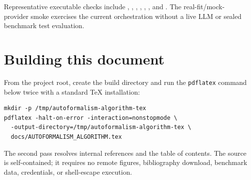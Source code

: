 \documentclass[11pt]{article}
\begin{document}
\begin{flushleft}
Representative executable checks include
,
,
,
,
,
, and
. The real-fit/mock-provider smoke
 exercises the current orchestration
without a live LLM or sealed benchmark test evaluation.
\end{flushleft}

\par\bigskip
\noindent\begin{minipage}{\linewidth}
\section{Building this document}
From the project root, create the build directory and run the
\texttt{pdflatex} command below twice with a standard TeX installation:
\begin{lstlisting}
mkdir -p /tmp/autoformalism-algorithm-tex
pdflatex -halt-on-error -interaction=nonstopmode \
  -output-directory=/tmp/autoformalism-algorithm-tex \
  docs/AUTOFORMALISM_ALGORITHM.tex
\end{lstlisting}
The second pass resolves internal references and the table of contents. The
source is self-contained; it requires no remote figures, bibliography download,
benchmark data, credentials, or shell-escape execution.
\end{minipage}
\end{document}
